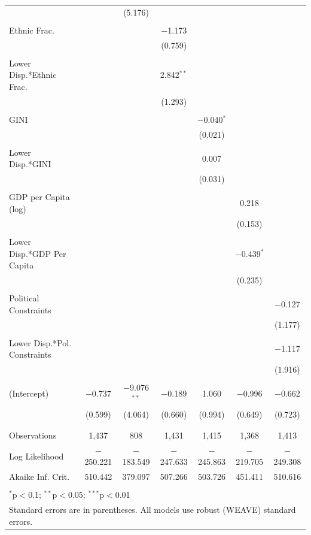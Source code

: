 \documentclass[a4paper]{article}\usepackage[]{graphicx}\usepackage[]{color}
\begin{document}
\begin{table}
\begin{center}
{\begin{tabular}{@{\extracolsep{5pt}}lcccccc}
  &  & (5.176) &  &  &  &  \\ 
  & & & & & & \\ 
 Ethnic Frac. &  &  & $-$1.173 &  &  &  \\ 
  &  &  & (0.759) &  &  &  \\ 
  & & & & & & \\ 
 Lower Disp.*Ethnic Frac. &  &  & 2.842$^{**}$ &  &  &  \\ 
  &  &  & (1.293) &  &  &  \\ 
  & & & & & & \\ 
 GINI &  &  &  & $-$0.040$^{*}$ &  &  \\ 
  &  &  &  & (0.021) &  &  \\ 
  & & & & & & \\ 
 Lower Disp.*GINI &  &  &  & 0.007 &  &  \\ 
  &  &  &  & (0.031) &  &  \\ 
  & & & & & & \\ 
 GDP per Capita (log) &  &  &  &  & 0.218 &  \\ 
  &  &  &  &  & (0.153) &  \\ 
  & & & & & & \\ 
 Lower Disp.*GDP Per Capita &  &  &  &  & $-$0.439$^{*}$ &  \\ 
  &  &  &  &  & (0.235) &  \\ 
  & & & & & & \\ 
 Political Constraints &  &  &  &  &  & $-$0.127 \\ 
  &  &  &  &  &  & (1.177) \\ 
  & & & & & & \\ 
 Lower Disp.*Pol. Constraints &  &  &  &  &  & $-$1.117 \\ 
  &  &  &  &  &  & (1.916) \\ 
  & & & & & & \\ 
 (Intercept) & $-$0.737 & $-$9.076$^{**}$ & $-$0.189 & 1.060 & $-$0.996 & $-$0.662 \\ 
  & (0.599) & (4.064) & (0.660) & (0.994) & (0.649) & (0.723) \\ 
  & & & & & & \\ 
\hline \\[-1.8ex] 
Observations & 1,437 & 808 & 1,431 & 1,415 & 1,368 & 1,413 \\ 
Log Likelihood & $-$250.221 & $-$183.549 & $-$247.633 & $-$245.863 & $-$219.705 & $-$249.308 \\ 
Akaike Inf. Crit. & 510.442 & 379.097 & 507.266 & 503.726 & 451.411 & 510.616 \\ 
\hline 
\hline \\[-1.8ex] 
\multicolumn{7}{l}{$^{*}$p$<$0.1; $^{**}$p$<$0.05; $^{***}$p$<$0.01} \\ 
\multicolumn{7}{l}{Standard errors are in parentheses. All models use robust (WEAVE) standard errors.} \\ 
\end{tabular} 

    }
    \end{center}
\end{table}
\end{document}
